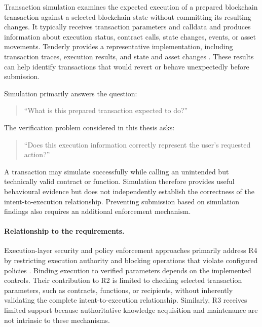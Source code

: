 Transaction simulation examines the expected execution of
a prepared blockchain transaction against a selected
blockchain state without committing its resulting changes.
It typically receives transaction parameters and calldata
and produces information about execution status, contract
calls, state changes, events, or asset movements. Tenderly provides a representative implementation, including
transaction traces, execution results, and state and asset
changes \cite{tenderlyTransactionSimulation2026}.
These results can help identify transactions that would
revert or behave unexpectedly before submission.

Simulation primarily answers the question:

\begin{quote}
``What is this prepared transaction expected to do?''
\end{quote}

The verification problem considered in this thesis asks:

\begin{quote}
``Does this execution information correctly represent the
user's requested action?''
\end{quote}

A transaction may simulate successfully while calling an
unintended but technically valid contract or function.
Simulation therefore provides useful behavioural evidence
but does not independently establish the correctness of
the intent-to-execution relationship. Preventing submission
based on simulation findings also requires an additional
enforcement mechanism.

\paragraph{Relationship to the requirements.}


Execution-layer security and policy enforcement approaches
primarily address R4 by restricting execution authority and
blocking operations that violate configured policies
\cite{buterinERC4337AccountAbstraction2021,
zeroDevPermissionsSessionKeys2026,
safeSmartAccountGuards2026}. Binding execution to verified
parameters depends on the implemented controls. Their contribution to R2 is limited to checking selected
transaction parameters, such as contracts, functions, or
recipients, without inherently validating the complete
intent-to-execution relationship. Similarly, R3 receives
limited support because authoritative knowledge acquisition
and maintenance are not intrinsic to these mechanisms.

